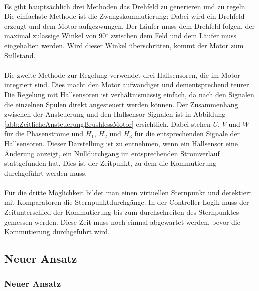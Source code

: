       \fi
       \\
        Es gibt hauptsächlich drei Methoden das Drehfeld zu generieren und zu 
        regeln. Die einfachste Methode ist die Zwangskommutierung: 
        Dabei wird ein Drehfeld erzeugt und dem Motor aufgezwungen. Der Läufer 
        muss dem Drehfeld folgen, der maximal zulässige Winkel von 90$^\circ$
        zwischen dem Feld und dem Läufer muss eingehalten werden. Wird dieser 
        Winkel überschritten, kommt der Motor zum Stillstand.\\
        \\
        Die zweite Methode zur Regelung verwendet drei Hallsensoren, die im 
        Motor integriert sind. Dies macht den Motor aufwändiger und 
        dementsprechend teurer. Die Regelung mit Hallsensoren ist 
        verhältnismässig einfach, da nach den Signalen die einzelnen Spulen 
        direkt angesteuert werden können. Der Zusammenhang zwischen der 
        Ansteuerung und den Hallsensor-Signalen ist in Abbildung 
        \ref{abb:ZeitlicheAnsteuerungBrushlessMotor} ersichtlich. Dabei stehen 
        $U$, $V$ und $W$ für die Phasenströme und $H_1$, $H_2$ und $H_3$ für die 
        entsprechenden Signale der Hallsensoren. Dieser Darstellung ist zu 
        entnehmen, wenn ein Hallsensor eine Änderung anzeigt, 
        ein Nulldurchgang im entsprechenden Stromverlauf stattgefunden hat. 
        Dies ist der Zeitpunkt, zu dem die Kommutierung durchgeführt werden 
        muss.\\
        \\
        Für die dritte Möglichkeit bildet man einen virtuellen Sternpunkt 
        und detektiert mit Komparatoren die Sternpunktdurchgänge. 
        In der Controller-Logik muss der Zeitunterschied der Kommutierung 
        bis zum durchschreiten des Sternpunktes gemessen werden. Diese Zeit 
        muss noch einmal abgewartet werden, bevor die Kommutierung durchgeführt 
        wird.
    \ifSTANDALONE
    \subsection{Neuer Ansatz}
    \fi
    \ifEMBED
    \subsubsection{Neuer Ansatz}
    \fi

